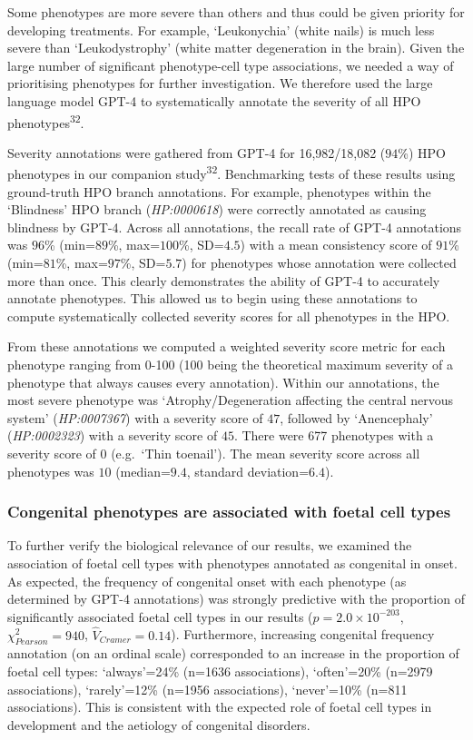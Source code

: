 \documentclass[
]{article}
\begin{document}
Some phenotypes are more severe than others and thus could be given
priority for developing treatments. For example, `Leukonychia' (white
nails) is much less severe than `Leukodystrophy' (white matter
degeneration in the brain). Given the large number of significant
phenotype-cell type associations, we needed a way of prioritising
phenotypes for further investigation. We therefore used the large
language model GPT-4 to systematically annotate the severity of all HPO
phenotypes\textsuperscript{32}.

Severity annotations were gathered from GPT-4 for 16,982/18,082
(\(94\)\%) HPO phenotypes in our companion study\textsuperscript{32}.
Benchmarking tests of these results using ground-truth HPO branch
annotations. For example, phenotypes within the `Blindness' HPO branch
(\emph{HP:0000618}) were correctly annotated as causing blindness by
GPT-4. Across all annotations, the recall rate of GPT-4 annotations was
\(96\)\% (min=\(89\)\%, max=\(100\)\%, SD=\(4.5\)) with a mean
consistency score of \(91\)\% (min=\(81\)\%, max=\(97\)\%, SD=\(5.7\))
for phenotypes whose annotation were collected more than once. This
clearly demonstrates the ability of GPT-4 to accurately annotate
phenotypes. This allowed us to begin using these annotations to compute
systematically collected severity scores for all phenotypes in the HPO.

From these annotations we computed a weighted severity score metric for
each phenotype ranging from 0-100 (100 being the theoretical maximum
severity of a phenotype that always causes every annotation). Within our
annotations, the most severe phenotype was `Atrophy/Degeneration
affecting the central nervous system' (\emph{HP:0007367}) with a
severity score of \(47\), followed by `Anencephaly' (\emph{HP:0002323})
with a severity score of \(45\). There were 677 phenotypes with a
severity score of 0 (e.g.~`Thin toenail'). The mean severity score
across all phenotypes was \(10\) (median=\(9.4\), standard
deviation=\(6.4\)).

\subsubsection{Congenital phenotypes are associated with foetal cell
types}\label{congenital-phenotypes-are-associated-with-foetal-cell-types}

To further verify the biological relevance of our results, we examined
the association of foetal cell types with phenotypes annotated as
congenital in onset. As expected, the frequency of congenital onset with
each phenotype (as determined by GPT-4 annotations) was strongly
predictive with the proportion of significantly associated foetal cell
types in our results (\(p=\)\(2.0 \times 10^{-203}\),
\(\chi^2_{Pearson}=\)\(940\), \(\hat{V}_{Cramer}=\)\(0.14\)).
Furthermore, increasing congenital frequency annotation (on an ordinal
scale) corresponded to an increase in the proportion of foetal cell
types: `always'=24\% (n=1636 associations), `often'=20\% (n=2979
associations), `rarely'=12\% (n=1956 associations), `never'=10\% (n=811
associations). This is consistent with the expected role of foetal cell
types in development and the aetiology of congenital disorders.
\end{document}
